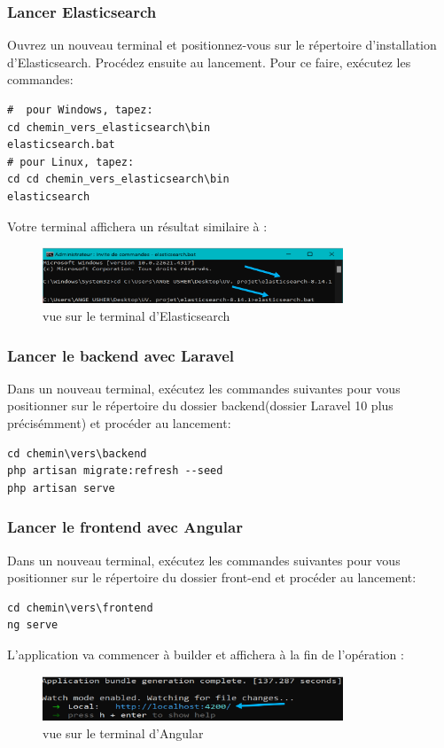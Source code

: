 \documentclass[12pt]{article}
\begin{document}
\subsubsection{Lancer Elasticsearch}
Ouvrez un nouveau terminal et positionnez-vous sur le répertoire d'installation d'Elasticsearch. Procédez ensuite au lancement. Pour ce faire, exécutez les commandes:
        \begin{lstlisting}
#  pour Windows, tapez:
cd chemin_vers_elasticsearch\bin
elasticsearch.bat
# pour Linux, tapez:
cd cd chemin_vers_elasticsearch\bin
elasticsearch
        \end{lstlisting}
\bigskip
\bigskip
Votre terminal affichera un résultat similaire à :
    \begin{figure}[h] 
        \centering 
        \includegraphics[width=0.8\textwidth]{./img/elastix.png} 
        \caption{vue sur le terminal d'Elasticsearch}
        \label{fig:vue sur le terminal d'Elasticsearch}
    \end{figure}
\bigskip

\subsubsection{Lancer le backend avec Laravel}
Dans un nouveau terminal, exécutez les commandes suivantes pour vous positionner sur le répertoire du dossier backend(dossier Laravel 10 plus précisémment) et procéder au lancement:
\smallskip
        \begin{lstlisting}
cd chemin\vers\backend
php artisan migrate:refresh --seed
php artisan serve
        \end{lstlisting}
\bigskip

\subsubsection{Lancer le frontend avec Angular}   
Dans un nouveau terminal, exécutez les commandes suivantes pour vous positionner sur le répertoire du dossier front-end et procéder au lancement:
\smallskip
        \begin{lstlisting}
cd chemin\vers\frontend
ng serve
        \end{lstlisting}
\bigskip
\medskip
L'application va commencer à builder et affichera à la fin de l'opération :
    \begin{figure}[h] 
        \centering 
        \includegraphics[width=0.8\textwidth]{./img/angular.png} 
        \caption{vue sur le terminal d'Angular}
        \label{fig:vue sur le terminal d'Angular}
    \end{figure}
\bigskip    
\end{document}
